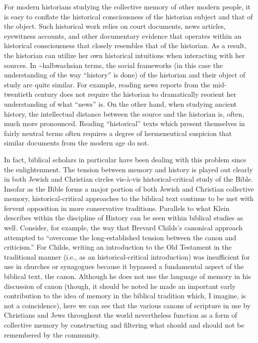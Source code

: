 For modern historians studying the collective memory of other modern
people, it is easy to conflate the historical consciousness of the
historian subject and that of the object. Such historical work relies on
court documents, news articles, eyewitness accounts, and other
documentary evidence that operates within an historical consciousness
that closely resembles that of the historian. As a result, the historian
can utilize her own historical intuitions when interacting with her
sources. In \textasciitilde{}halbwachsian terms, the social frameworks
(in this case the understanding of the way ``history'' is done) of the
historian and their object of study are quite similar. For example,
reading news reports from the mid-twentieth century does not require the
historian to dramatically reorient her understanding of what ``news''
is. On the other hand, when studying ancient history, the intellectual
distance between the source and the historian is, often, much more
pronounced. Reading ``historical'' texts which present themselves in
fairly neutral terms often requires a degree of hermeneutical suspicion
that similar documents from the modern age do not.

In fact, biblical scholars in particular have been dealing with this
problem since the enlightenment. The tension between memory and history
is played out clearly in both Jewish and Christian circles vis-à-vis
historical-critical study of the Bible. Insofar as the Bible forms a
major portion of both Jewish and Christian collective memory,
historical-critical approaches to the biblical text continue to be met
with fervent opposition in more conservative traditions. Parallels to
what Klein describes within the discipline of History can be seen within
biblical studies as well. Consider, for example, the way that Brevard
Childs's canonical approach attempted to ``overcome the long-established
tension between the canon and criticism.''\autocite[45]{childs1979} For
Childs, writing an introduction to the Old Testament in the traditional
manner (i.e., as an historical-critical introduction) was insufficient
for use in churches or synagogues because it bypassed a fundamental
aspect of the biblical text, the canon. Although he does not use the
language of memory in his discussion of canon (though, it should be
noted he made an important early contribution to the idea of memory in
the biblical tradition which, I imagine, is not a
coincidence\autocite{childs1962}), here we can see that the various
canons of scripture in use by Christians and Jews throughout the world
nevertheless function as a form of collective memory by constructing and
filtering what should and should not be remembered by the community.

